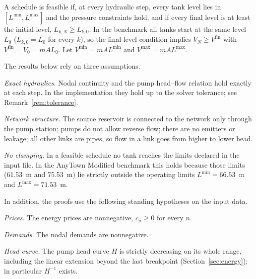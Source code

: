 \documentclass[11pt]{article}
\theoremstyle{remark}
\newenvironment{assumption}[2]
  {\begin{trivlist}\item[\hskip\labelsep(#1)]\emph{#2.}}
  {\end{trivlist}}
\newcommand{\Vmin}{V^{\min}}
\newcommand{\Vmax}{V^{\max}}
\newcommand{\Vfin}{V^{\mathrm{fin}}}
\newcommand{\Lmin}{L^{\min}}
\newcommand{\Lmax}{L^{\max}}
\begin{document}
A schedule is feasible if, at every hydraulic step, every tank level lies in
$[\Lmin, \Lmax]$ and the pressure constraints hold, and if every final level is at least
the initial level, $L_{k,N} \ge L_{k,0}$. In the benchmark all tanks start at the same
level $L_0$ ($L_{k,0} = L_0$ for every $k$), so the final-level condition implies
$V_N \ge \Vfin$ with $\Vfin = V_0 = mAL_0$. Let $\Vmin = mA\Lmin$ and $\Vmax = mA\Lmax$.

The results below rely on three assumptions.

\begin{assumption}{A1}{Exact hydraulics}
Nodal continuity and the pump head--flow relation hold exactly at each step. In the
implementation they hold up to the solver tolerance; see Remark~\ref{rem:tolerance}.
\end{assumption}

\begin{assumption}{A2}{Network structure}
The source reservoir is connected to the network only through the pump station; pumps do
not allow reverse flow; there are no emitters or leakage; all other links are pipes, so
flow in a link goes from higher to lower head.
\end{assumption}

\begin{assumption}{A3}{No clamping}
In a feasible schedule no tank reaches the limits declared in the input file. In the
AnyTown Modified benchmark this holds because those limits (61.53~m and 75.53~m) lie
strictly outside the operating limits $\Lmin = 66.53$~m and $\Lmax = 71.53$~m.
\end{assumption}

In addition, the proofs use the following standing hypotheses on the input data.

\begin{assumption}{S1}{Prices}
The energy prices are nonnegative, $c_n \ge 0$ for every $n$.
\end{assumption}

\begin{assumption}{S2}{Demands}
The nodal demands are nonnegative.
\end{assumption}

\begin{assumption}{S3}{Head curve}
The pump head curve $H$ is strictly decreasing on its whole range, including the linear
extension beyond the last breakpoint (Section~\ref{sec:energy}); in particular $H^{-1}$
exists.
\end{assumption}
\end{document}
